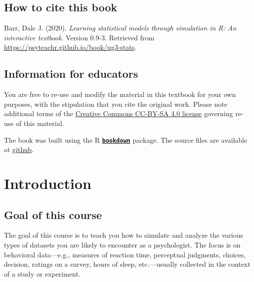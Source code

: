 \documentclass[]{book}
\begin{document}
\hypertarget{how-to-cite-this-book}{%
\section*{How to cite this book}\label{how-to-cite-this-book}}

Barr, Dale J. (2020). \emph{Learning statistical models through simulation in R: An interactive textbook}. Version 0.9-3. Retrieved from \url{https://psyteachr.github.io/book/ug3-stats}.

\hypertarget{information-for-educators}{%
\section*{Information for educators}\label{information-for-educators}}

You are free to re-use and modify the material in this textbook for your own purposes, with the stipulation that you cite the original work. Please note additional terms of the \href{https://creativecommons.org/licenses/by-sa/4.0/}{Creative Commons CC-BY-SA 4.0 license} governing re-use of this material.

The book was built using the R \href{https://bookdown.org}{\textbf{\texttt{bookdown}}} package. The source files are available at \href{https://github.com/psyteachr/ug3-stats}{github}.

\hypertarget{introduction}{%
\chapter{Introduction}\label{introduction}}

\hypertarget{goal-of-this-course}{%
\section{Goal of this course}\label{goal-of-this-course}}

The goal of this course is to teach you how to simulate and analyze the various types of datasets you are likely to encounter as a psychologist. The focus is on behavioral data---e.g., measures of reaction time, perceptual judgments, choices, decision, ratings on a survey, hours of sleep, etc.---usually collected in the context of a study or experiment.
\end{document}
